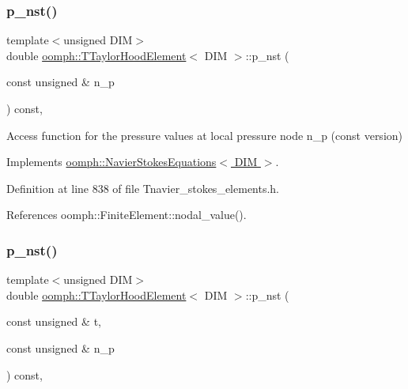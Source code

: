 \mbox{\label{classoomph_1_1TTaylorHoodElement_aabf332af5cb1c937251466fbb1cb7274}} 
\subsubsection{\texorpdfstring{p\+\_\+nst()}{p\_nst()}\hspace{0.1cm}{\footnotesize\ttfamily [1/2]}}
{\footnotesize\ttfamily template$<$unsigned D\+IM$>$ \\
double \hyperlink{classoomph_1_1TTaylorHoodElement}{oomph\+::\+T\+Taylor\+Hood\+Element}$<$ D\+IM $>$\+::p\+\_\+nst (\begin{DoxyParamCaption}\item[{const unsigned \&}]{n\+\_\+p }\end{DoxyParamCaption}) const\hspace{0.3cm}{\ttfamily [inline]}, {\ttfamily [virtual]}}



Access function for the pressure values at local pressure node n\+\_\+p (const version) 



Implements \hyperlink{classoomph_1_1NavierStokesEquations_ae00a22f99df3630b3ab751a4453a7fd8}{oomph\+::\+Navier\+Stokes\+Equations$<$ D\+I\+M $>$}.



Definition at line 838 of file Tnavier\+\_\+stokes\+\_\+elements.\+h.



References oomph\+::\+Finite\+Element\+::nodal\+\_\+value().

\mbox{\label{classoomph_1_1TTaylorHoodElement_aa04b4b4ec9d1e04f4d6b6bb00c8fa629}} 
\subsubsection{\texorpdfstring{p\+\_\+nst()}{p\_nst()}\hspace{0.1cm}{\footnotesize\ttfamily [2/2]}}
{\footnotesize\ttfamily template$<$unsigned D\+IM$>$ \\
double \hyperlink{classoomph_1_1TTaylorHoodElement}{oomph\+::\+T\+Taylor\+Hood\+Element}$<$ D\+IM $>$\+::p\+\_\+nst (\begin{DoxyParamCaption}\item[{const unsigned \&}]{t,  }\item[{const unsigned \&}]{n\+\_\+p }\end{DoxyParamCaption}) const\hspace{0.3cm}{\ttfamily [inline]}, {\ttfamily [virtual]}}




